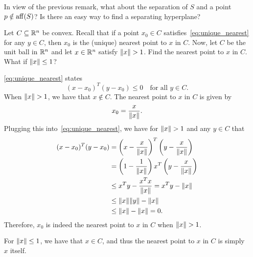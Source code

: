 \begin{exercise}
  In view of the previous remark, what about the separation of $S$ and a point $p \notin \operatorname*{aff}(S)$?
  Is there an easy way to find a separating hyperplane?
\end{exercise}

\begin{solution}

\end{solution}

\begin{exercise}
  Let $C \subseteq \mathbb{R}^n$ be convex.
  Recall that if a point $x_0 \in C$ satisfies~\eqref{eq:unique_nearest} for any $y \in C$, then $x_0$ is the (unique) nearest point to $x$ in $C$.
  Now, let $C$ be the unit ball in $\mathbb{R}^n$ and let $x \in \mathbb{R}^n$ satisfy $\lVert x\rVert > 1$.
  Find the nearest point to $x$ in $C$.
  What if $\lVert x\rVert \leq 1$?
\end{exercise}

\begin{solution}
  \eqref{eq:unique_nearest} states %
  \begin{equation}\label{eq:unique_nearest}
    (x - x_0)^T (y - x_0) \leq 0 \quad \text{for all } y \in C. \tag{3.2}
  \end{equation}
  When $\lVert x\rVert > 1$, we have that $x \notin C$.
  The nearest point to $x$ in $C$ is given by
  \begin{equation}
    x_0 = \frac{x}{\lVert x\rVert}.
  \end{equation}
  Plugging this into~\eqref{eq:unique_nearest}, we have for $\lVert x\rVert > 1$ and any $y \in C$ that
  \begin{equation}
    \begin{split}
      (x - x_0)^T (y - x_0) &= \left(x - \frac{x}{\lVert x\rVert}\right)^T \left(y - \frac{x}{\lVert x\rVert}\right) \\
      &= \left(1 - \frac{1}{\lVert x\rVert}\right) x^T \left(y - \frac{x}{\lVert x\rVert}\right) \\
      &\leq x^T y - \frac{x^T x}{\lVert x\rVert}
      = x^T y - \lVert x\rVert \\
      &\leq \lVert x\rVert \lVert y\rVert - \lVert x\rVert \\
      &\leq \lVert x\rVert - \lVert x\rVert
      = 0.
    \end{split}
  \end{equation}
  Therefore, $x_0$ is indeed the nearest point to $x$ in $C$ when $\lVert x\rVert > 1$.

  For $\lVert x\rVert \leq 1$, we have that $x \in C$, and thus the nearest point to $x$ in $C$ is simply $x$ itself.
\end{solution}


